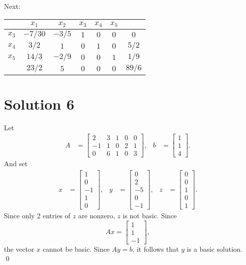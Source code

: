 \documentclass[a4paper, 12pt]{article}
\numberwithin{equation}{section}
\numberwithin{figure}{section}
\theoremstyle{definition}
\begin{document}
\noindent Next:
\begin{center}
    \begin{tabular}{|c|ccccc|c|}
        \hline 
        & $x_1$ & $x_2$ & $x_3$ & $x_4$ & $x_5$ & \\ \hline
        $x_3$ & $-7/30$ & $-3/5$ & $1$ & $0$ & $0$ & $0$ \\ 
        $x_4$ & $3/2$ & $1$ & $0$ & $1$ & $0$ & $5/2$ \\ 
        $x_5$ & $14/3$ & $-2/9$ & $0$ & $0$ & $1$ & $1/9$ \\ \hline
        & $23/2$ & $5$ & $0$ & $0$ & $0$ & $89/6$ \\ \hline
    \end{tabular}
\end{center}


\section*{Solution 6}

Let
\begin{align*}
    A &= \begin{bmatrix}
        2 & 3 & 1 & 0 & 0 \\ 
        -1 & 1 & 0 & 2 & 1 \\
        0 & 6 & 1 & 0 & 3
    \end{bmatrix}, & b &= \begin{bmatrix}
        1 \\ 1 \\ 4
    \end{bmatrix}.
\end{align*}
And set 
\begin{align*}
    x &= \begin{bmatrix}
        1 \\ 0 \\ -1 \\ 1 \\ 0 
    \end{bmatrix}, & y &= \begin{bmatrix}
        0 \\ 2 \\ -5 \\ 0 \\ -1 
    \end{bmatrix}, & z &= \begin{bmatrix}
        0 \\ 0 \\ 1 \\ 0 \\ 1
    \end{bmatrix}.
\end{align*}
Since only 2 entries of $z$ are nonzero, $z$ is not basic. Since 
\[ 
    Ax = \begin{bmatrix}
        1 \\ 1 \\ -1
    \end{bmatrix},
\]
the vector $x$ cannot be basic. Since $Ay=b$, it follows that $y$ is a basic
solution. \qed
\end{document}
